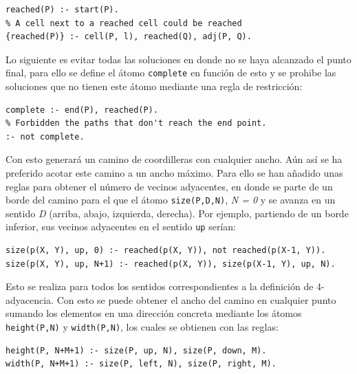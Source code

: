 \begin{lstlisting}[label=lst:mreached]
% The start cell is reached always.
reached(P) :- start(P).
% A cell next to a reached cell could be reached
{reached(P)} :- cell(P, l), reached(Q), adj(P, Q).
\end{lstlisting}

\hspace{1em}

Lo siguiente es evitar todas las soluciones en donde no se haya alcanzado el punto final, para ello se define el átomo \texttt{complete} en función de esto y se prohibe las soluciones que no tienen este átomo mediante una regla de restricción: \\

\begin{lstlisting}[label=lst:mend]
% The path is complete if the end is reached.
complete :- end(P), reached(P).
% Forbidden the paths that don't reach the end point.
:- not complete.
\end{lstlisting}

\hspace{1em}

Con esto generará un camino de coordilleras con cualquier ancho. Aún así se ha preferido acotar este camino a un ancho máximo. Para ello se han añadido unas reglas para obtener el número de vecinos adyacentes, en donde se parte de un borde del camino para el que el átomo \texttt{size(P,D,N)}, \textit{N = 0} y se avanza en un sentido \textit{D} (arriba, abajo, izquierda, derecha). Por ejemplo, partiendo de un borde inferior, sus vecinos adyacentes en el sentido \texttt{up} serían: \\

\begin{lstlisting}[label=lst:msizedef]
size(p(X, Y), up, 0) :- reached(p(X, Y)), not reached(p(X-1, Y)).
size(p(X, Y), up, N+1) :- reached(p(X, Y)), size(p(X-1, Y), up, N).
\end{lstlisting}

\hspace{1em}

Esto se realiza para todos los sentidos correspondientes a la definición de 4-adyacencia. Con esto se puede obtener el ancho del camino en cualquier punto sumando los elementos en una dirección concreta mediante los átomos \texttt{height(P,N)} y \texttt{width(P,N)}, los cuales se obtienen con las reglas:

\begin{lstlisting}[label=lst:msize]
height(P, N+M+1) :- size(P, up, N), size(P, down, M).
width(P, N+M+1) :- size(P, left, N), size(P, right, M).
\end{lstlisting}

